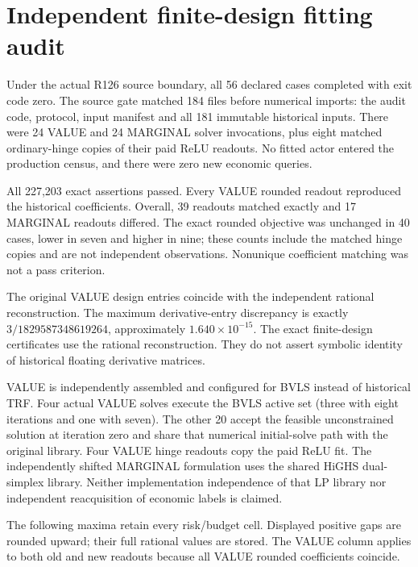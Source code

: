\section{Independent finite-design fitting audit}

\label{dev:fitaudit126}

Under the actual R126 source boundary, all 56 declared cases completed with exit code zero. The source gate matched 184 files before numerical imports: the audit code, protocol, input manifest and all 181 immutable historical inputs. There were 24 VALUE and 24 MARGINAL solver invocations, plus eight matched ordinary-hinge copies of their paid ReLU readouts. No fitted actor entered the production census, and there were zero new economic queries.

All 227,203 exact assertions passed. Every VALUE rounded readout reproduced the historical coefficients. Overall, 39 readouts matched exactly and 17 MARGINAL readouts differed. The exact rounded objective was unchanged in 40 cases, lower in seven and higher in nine; these counts include the matched hinge copies and are not independent observations. Nonunique coefficient matching was not a pass criterion.

The original VALUE design entries coincide with the independent rational reconstruction. The maximum derivative-entry discrepancy is exactly $3/1829587348619264$, approximately $1.640\times10^{-15}$. The exact finite-design certificates use the rational reconstruction. They do not assert symbolic identity of historical floating derivative matrices.

VALUE is independently assembled and configured for BVLS instead of historical TRF. Four actual VALUE solves execute the BVLS active set (three with eight iterations and one with seven). The other 20 accept the feasible unconstrained solution at iteration zero and share that numerical initial-solve path with the original library. Four VALUE hinge readouts copy the paid ReLU fit. The independently shifted MARGINAL formulation uses the shared HiGHS dual-simplex library. Neither implementation independence of that LP library nor independent reacquisition of economic labels is claimed.


The following maxima retain every risk/budget cell. Displayed positive gaps are rounded upward; their full rational values are stored. The VALUE column applies to both old and new readouts because all VALUE rounded coefficients coincide.


